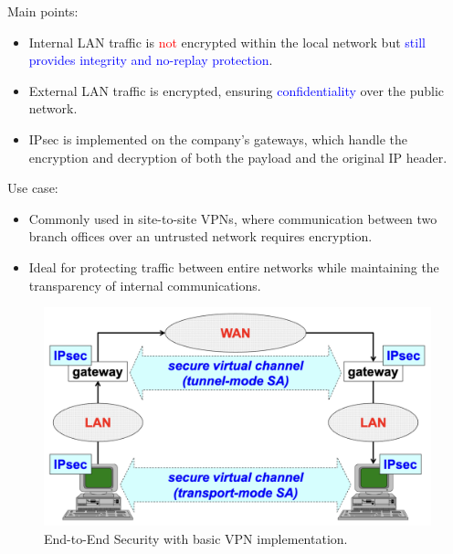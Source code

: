 Main points:
\begin{itemize}
    \item Internal LAN traffic is \textcolor{red}{not} encrypted within the local network but \textcolor{Blue}{still provides integrity and no-replay protection}.
    \item External LAN traffic is encrypted, ensuring \textcolor{Blue}{confidentiality} over the public network.
    \item IPsec is implemented on the company’s gateways, which handle the encryption and decryption of both the payload and the original IP header.
    \end{itemize}

Use case:
\begin{itemize}
\item Commonly used in site-to-site VPNs, where communication between two branch offices over an untrusted network requires encryption.
\item Ideal for protecting traffic between entire networks while maintaining the transparency of internal communications.
\end{itemize}

\begin{figure}[H]
    \includegraphics[width=\linewidth]{Images/NetSec/end_vpn.png}
    \caption{End-to-End Security with basic VPN implementation.}
    \label{fig:end_vpn}
\end{figure}

